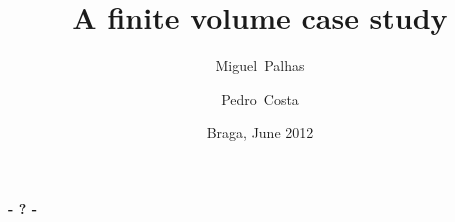 \documentclass{beamer}
\title{A finite volume case study}
\author[M. Palhas \and P. Costa]{Miguel~Palhas \and Pedro~Costa}
\institute[19808 \and 19830]{
	Department of Informatics\\
	University of Minho
}
\date{Braga, June 2012}
\begin{document}

\frame[plain]{\titlepage}







% 
% 

\begin{frame}[plain]
	\titlepage
	\begin{center}
		\Huge\bfseries - ? -
	\end{center}
\end{frame}
\end{document}
